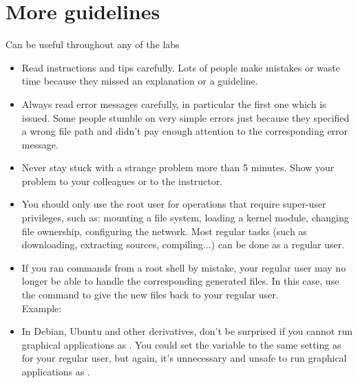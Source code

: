 \section{More guidelines}

Can be useful throughout any of the labs

\begin{itemize}

\item Read instructions and tips carefully. Lots of people make
  mistakes or waste time because they missed an explanation or a
  guideline.

\item Always read error messages carefully, in particular the first
  one which is issued. Some people stumble on very simple errors just
  because they specified a wrong file path and didn't pay enough
  attention to the corresponding error message.

\item Never stay stuck with a strange problem more than 5
  minutes. Show your problem to your colleagues or to the instructor.

\item You should only use the root user for operations that require
  super-user privileges, such as: mounting a file system, loading a
  kernel module, changing file ownership, configuring the
  network. Most regular tasks (such as downloading, extracting
  sources, compiling...) can be done as a regular user.

\item If you ran commands from a root shell by mistake, your regular
  user may no longer be able to handle the corresponding generated
  files. In this case, use the  command to give the new
  files back to your regular user.\\
  Example: 

\item In Debian, Ubuntu and other derivatives, don't be surprised if
  you cannot run graphical applications as . You could set the
   variable to the same setting as for your regular user, but
  again, it's unnecessary and unsafe to run graphical applications as
  .

\end{itemize}

